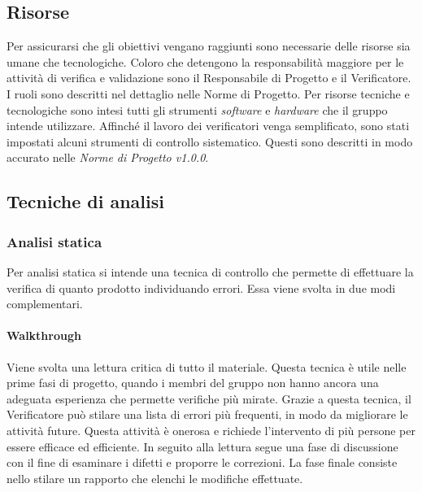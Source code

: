 \subsection{Risorse}
Per assicurarsi che gli obiettivi vengano raggiunti sono necessarie delle 
risorse sia umane che tecnologiche. Coloro che detengono la responsabilità 
maggiore per le attività di verifica e validazione sono il Responsabile di 
Progetto e il Verificatore. I ruoli sono descritti nel dettaglio nelle Norme di 
Progetto. \newline
Per risorse tecniche e tecnologiche sono intesi tutti gli strumenti 
\textit{software} e \textit{hardware} che il gruppo intende utilizzare. 
Affinché il lavoro dei verificatori venga semplificato, sono stati impostati 
alcuni strumenti di controllo sistematico. Questi sono descritti in modo 
accurato nelle \textit{Norme di Progetto v1.0.0}.

\subsection{Tecniche di analisi}

\subsubsection{Analisi statica}
Per analisi statica si intende una tecnica di controllo che permette di effettuare la verifica di quanto prodotto individuando errori. Essa viene svolta in due modi complementari.

\paragraph{Walkthrough}
Viene svolta una lettura critica di tutto il materiale. Questa tecnica è utile 
nelle prime fasi di progetto, quando i membri del gruppo non hanno ancora una 
adeguata esperienza che permette verifiche più mirate. \newline
Grazie a questa tecnica, il Verificatore può stilare una lista di errori più frequenti, in modo da migliorare le attività future.\newline
Questa attività è onerosa e richiede l'intervento di più persone per essere efficace ed efficiente. In seguito alla lettura segue una fase di discussione con il fine di esaminare i difetti e proporre le correzioni. La fase finale consiste nello stilare un rapporto che elenchi le modifiche effettuate.

